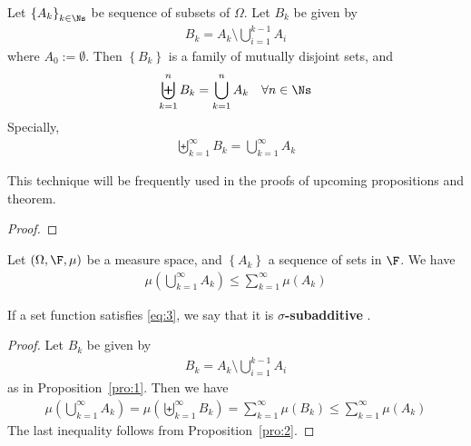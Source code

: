 \documentclass[thmcnt=section, 12pt]{elegantbook}
\begin{document}
\begin{proposition} \label{pro:1}
    Let $\left\{A_k\right\}_{k\in\Ns}$ be sequence of subsets of $\Omega$. Let $B_k$ be given by 
    \begin{align*}
        B_k = A_k \setminus \bigcup_{i=1}^{k-1} A_i
    \end{align*}
    where $A_0 := \emptyset$. Then $\left\{ B_k \right\}$ is a family of mutually disjoint sets, and 
    \begin{align*}
        \biguplus_{k=1}^n B_k 
        = \bigcup_{k=1}^n A_k
        \quad \forall n \in \Ns
    \end{align*}
    Specially, 
    \begin{align*}
        \biguplus_{k=1}^\infty B_k 
        = \bigcup_{k=1}^\infty A_k
    \end{align*}
\end{proposition}

\begin{remark}
    This technique will be frequently used in the proofs of upcoming propositions and theorem.
\end{remark}

\begin{proof}
\end{proof}


\begin{proposition}
    Let $(\Omega, \F, \mu)$ be a measure space, and $\left\{A_k\right\}$ a sequence of sets in $\F$. We have 
    \begin{align}
        \mu\left(\bigcup_{k=1}^\infty A_k\right)
        \leq \sum_{k=1}^\infty \mu(A_k)
        \label{eq:3}
    \end{align}
\end{proposition}

\begin{remark}
    If a set function satisfies \eqref{eq:3}, we say that it is \textbf{$\sigma$-subadditive} .
\end{remark}

\begin{proof}
    Let $B_k$ be given by 
    \begin{align*}
        B_k = A_k \setminus \bigcup_{i=1}^{k-1} A_i
    \end{align*}
    as in Proposition~\ref{pro:1}. Then we have 
    \begin{align*}
        \mu\left(\bigcup_{k=1}^\infty A_k\right)
        = \mu\left(\biguplus_{k=1}^\infty B_k\right)
        = \sum_{k=1}^\infty \mu(B_k)
        \leq \sum_{k=1}^\infty \mu(A_k)
    \end{align*}
    The last inequality follows from Proposition~\ref{pro:2}.
\end{proof}
\end{document}
